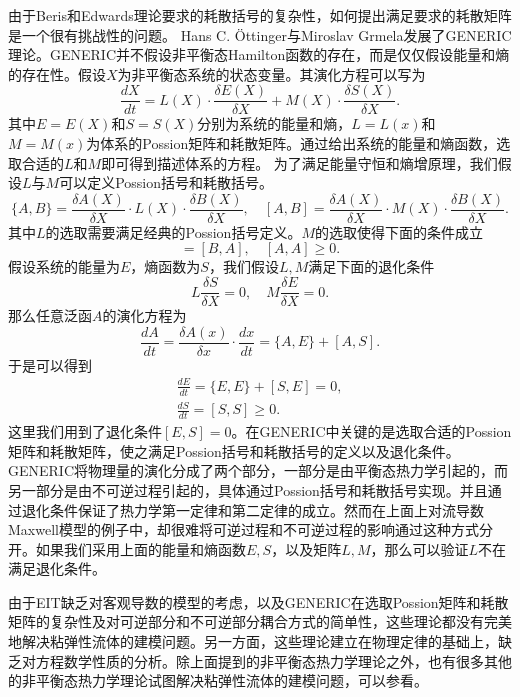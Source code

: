 \documentclass{article}
\begin{document}
由于Beris和Edwards理论要求的耗散括号的复杂性，如何提出满足要求的耗散矩阵是一个很有挑战性的问题。
 Hans C. \"Ottinger与Miroslav Grmela发展了GENERIC理论。GENERIC并不假设非平衡态Hamilton函数的存在，而是仅仅假设能量和熵的存在性。假设$X$为非平衡态系统的状态变量。其演化方程可以写为
\begin{equation*}
	\frac{dX}{dt} = L(X) \cdot \frac{\delta E(X)}{\delta X} + M(X) \cdot \frac{\delta S(X)}{\delta X} .
\end{equation*}
其中$E=E(X)$和$S=S(X)$分别为系统的能量和熵，$L=L(x)$和$M=M(x)$为体系的Possion矩阵和耗散矩阵。通过给出系统的能量和熵函数，选取合适的$L$和$M$即可得到描述体系的方程。 为了满足能量守恒和熵增原理，我们假设$L$与$M$可以定义Possion括号和耗散括号。
\begin{equation*}
	\{ A,B \} = \frac{\delta A(X)}{\delta X} \cdot L(X) \cdot \frac{\delta B(X)}{\delta X}, \quad  [ A,B ] = \frac{\delta A(X)}{\delta X} \cdot M(X) \cdot \frac{\delta B(X)}{\delta X}. 
\end{equation*}
其中$L$的选取需要满足经典的Possion括号定义。$M$的选取使得下面的条件成立
\begin{equation*}
	[A,B] = [B,A], \quad [A,A] \ge 0.
\end{equation*}
假设系统的能量为$E$，熵函数为$S$，我们假设$L,M$满足下面的退化条件
\begin{equation}
	L \frac{\delta S}{\delta X} = 0, \quad M \frac{\delta E}{\delta X} = 0.
\end{equation}
那么任意泛函$A$的演化方程为
 \begin{equation*}
	\frac{d A}{dt} = \frac{\delta A(x)}{\delta x} \cdot \frac{dx}{dt} = \{ A,E\} + [A,S].
\end{equation*}
于是可以得到
\begin{eqnarray*}
	\frac{d E}{dt} = \{E,E\} +[S,E] = 0, \\
	\frac{d S}{dt} = [S,S] \ge 0. 
\end{eqnarray*}
这里我们用到了退化条件$[E,S] = 0$。在GENERIC中关键的是选取合适的Possion矩阵和耗散矩阵，使之满足Possion括号和耗散括号的定义以及退化条件。GENERIC将物理量的演化分成了两个部分，一部分是由平衡态热力学引起的，而另一部分是由不可逆过程引起的，具体通过Possion括号和耗散括号实现。并且通过退化条件保证了热力学第一定律和第二定律的成立。然而在上面上对流导数Maxwell模型的例子中，却很难将可逆过程和不可逆过程的影响通过这种方式分开。如果我们采用上面的能量和熵函数$E,S$，以及矩阵$L,M$，那么可以验证$L$不在满足退化条件。  

由于EIT缺乏对客观导数的模型的考虑，以及GENERIC在选取Possion矩阵和耗散矩阵的复杂性及对可逆部分和不可逆部分耦合方式的简单性，这些理论都没有完美地解决粘弹性流体的建模问题。另一方面，这些理论建立在物理定律的基础上，缺乏对方程数学性质的分析。除上面提到的非平衡态热力学理论之外，也有很多其他的非平衡态热力学理论试图解决粘弹性流体的建模问题，可以参看\cite{}。
\end{document}
